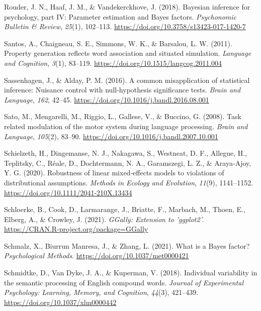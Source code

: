 \documentclass[
  12pt,
  man,floatsintext]{apa7}
\newlength{\cslhangindent}
\newlength{\cslentryspacingunit} %
\newenvironment{CSLReferences}[2] %
 {%
  \setlength{\parindent}{0pt}
  \ifodd #1
  \let\oldpar\par
  \def\par{\hangindent=\cslhangindent\oldpar}
  \fi
  \setlength{\parskip}{#2\cslentryspacingunit}
 }%
 {}
\begin{document}
\begin{CSLReferences}{1}{0}
\leavevmode{}%
Rouder, J. N., Haaf, J. M., \& Vandekerckhove, J. (2018). Bayesian inference for psychology, part {IV}: {Parameter} estimation and {Bayes} factors. \emph{Psychonomic Bulletin \& Review}, \emph{25}(1), 102--113. \url{https://doi.org/10.3758/s13423-017-1420-7}

\leavevmode{}%
Santos, A., Chaigneau, S. E., Simmons, W. K., \& Barsalou, L. W. (2011). Property generation reflects word association and situated simulation. \emph{Language and Cognition}, \emph{3}(1), 83--119. \url{https://doi.org/10.1515/langcog.2011.004}

\leavevmode{}%
Sassenhagen, J., \& Alday, P. M. (2016). A common misapplication of statistical inference: {Nuisance} control with null-hypothesis significance tests. \emph{Brain and Language}, \emph{162}, 42--45. \url{https://doi.org/10.1016/j.bandl.2016.08.001}

\leavevmode{}%
Sato, M., Mengarelli, M., Riggio, L., Gallese, V., \& Buccino, G. (2008). Task related modulation of the motor system during language processing. \emph{Brain and Language}, \emph{105}(2), 83--90. \url{https://doi.org/10.1016/j.bandl.2007.10.001}

\leavevmode{}%
Schielzeth, H., Dingemanse, N. J., Nakagawa, S., Westneat, D. F., Allegue, H., Teplitsky, C., Réale, D., Dochtermann, N. A., Garamszegi, L. Z., \& Araya‐Ajoy, Y. G. (2020). Robustness of linear mixed‐effects models to violations of distributional assumptions. \emph{Methods in Ecology and Evolution}, \emph{11}(9), 1141--1152. \url{https://doi.org/10.1111/2041-210X.13434}

\leavevmode{}%
Schloerke, B., Cook, D., Larmarange, J., Briatte, F., Marbach, M., Thoen, E., Elberg, A., \& Crowley, J. (2021). \emph{GGally: Extension to 'ggplot2'}. \url{https://CRAN.R-project.org/package=GGally}

\leavevmode{}%
Schmalz, X., Biurrun Manresa, J., \& Zhang, L. (2021). What is a {Bayes} factor? \emph{Psychological Methods}. \url{https://doi.org/10.1037/met0000421}

\leavevmode{}%
Schmidtke, D., Van Dyke, J. A., \& Kuperman, V. (2018). Individual variability in the semantic processing of {English} compound words. \emph{Journal of Experimental Psychology: Learning, Memory, and Cognition}, \emph{44}(3), 421--439. \url{https://doi.org/10.1037/xlm0000442}


\end{CSLReferences}
\end{document}
